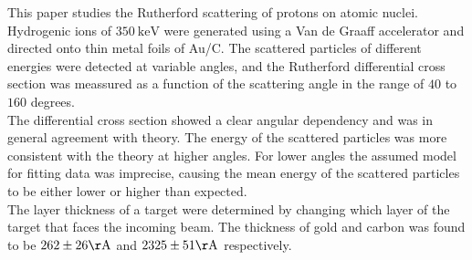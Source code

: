 This paper studies the Rutherford scattering of protons on atomic
nuclei. Hydrogenic ions of $\SI{350}{\kilo\electronvolt}$ were generated using
a Van de Graaff accelerator and directed onto thin metal foils of Au/C. The
scattered particles of different energies were detected at variable angles,
and the Rutherford differential cross section was meassured as a function of
the scattering angle in the range of $40$ to $160$ degrees. \\
The differential cross section showed a clear angular dependency and was in
general agreement with theory. The energy of the scattered particles was more consistent with the theory at higher angles. For lower angles the assumed model for fitting data was
imprecise, causing the mean energy of the scattered particles to be either lower or higher than expected. \\
The layer thickness of a target were determined by changing which layer of the target that faces the incoming beam. The thickness of gold and carbon was found to be $262\pm26\si{\AA}$ and $2325\pm51\si{\AA}$ respectively. 


